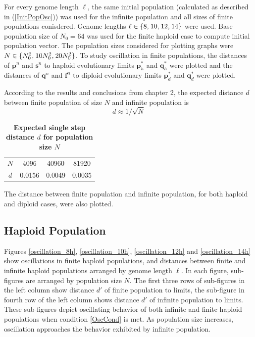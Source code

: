 For every genome length $\ell$, the same initial population (calculated as described in (\ref{InitPopOsc})) was used for the infinite population and all 
sizes of finite populations conisdered.
Genome lengths $\ell \in \{8, \hspace{0.01in}10, \hspace{0.01in}12, \hspace{0.01in}14\}$ were used. Base population size of $N_0 = 64$ was used 
for the finite haploid case to compute initial population vector. The population sizes considered for plotting 
graphs were $N \in \{N_0^2, \hspace{0.01in}10N_0^2, \hspace{0.01in}20N_0^2\}$. 
To study oscillation in finite populations, the distances of $\bm{p}^n$ and $\bm{s}^n$ to haploid evolutionary limits $\bm{p}_h^{\ast}$ and 
$\bm{q}_h^{\ast}$ were plotted and the distances of $\bm{q}^n$ and 
$\bm{f}^n$ to diploid evolutionary limits $\bm{p}_d^{\ast}$ and $\bm{q}_d^{\ast}$ were plotted. 

According to the results and conclusions from 
chapter 2, the expected distance $d$ between finite population of size $N$ and infinite population is 
\[ d \approx 1/\sqrt{N} \]
\begin{table}[H]
\caption{\textbf{Expected single step distance $d$ for population size $N$}}
\centering
\begin{tabular}{c c c c}
\hline
$N$ & 4096 & 40960 & 81920 \\
$d$ & 0.0156 & 0.0049 & 0.0035 \\
\hline
\end{tabular}
\label{tableExpectedDistance}
\end{table}
The distance between finite population and infinite population, for both haploid and diploid cases, were also plotted. 

\clearpage
\subsection{Haploid Population}


Figures \ref{oscillation_8h}, \ref{oscillation_10h}, \ref{oscillation_12h} and
\ref{oscillation_14h} show oscillations in finite haploid populations, and distances 
between finite and infinite haploid populations arranged by genome length $\ell$. 
In each figure, sub-figures are arranged by population size $N$. 
The first three rows of sub-figures in the left column show distance $d'$ of finite population 
to limits, the sub-figure in fourth row of the left column shows distance $d'$ of infinite population to limits. 
These sub-figures depict 
oscillating behavior of both infinite and finite haploid populations when condition \ref{OscCond} is met. 
As population size increases, oscillation approaches the behavior exhibited by infinite population. 

